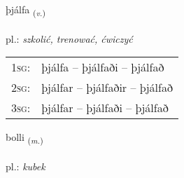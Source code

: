 \documentclass[frontgrid, backgrid]{flacards}\usepackage[]{graphicx}\usepackage[]{xcolor}
\begin{document}
\renewcommand{\flhead}{\vskip5pt \fboxsep=0pt {\small\bfseries\footnotesize Sagnorð | czasownik}}
\renewcommand{\fcfoot}{\vskip5pt \fboxsep=0pt \hspace{2pt}{\small\bfseries\footnotesize 3K}}

\renewcommand{\blhead}{\vskip5pt {\small\bfseries\footnotesize Sagnorð | czasownik }}
\renewcommand{\bcfoot}{\vskip5pt \hspace{2pt}{\small\bfseries\footnotesize 3K}}


{þjálfa \small{\textsubscript{(\textit{v.})}} \\[1ex] %
\textphonetic{[θjaulva]} \\
pl.: \emph{szkolić, trenować, ćwiczyć} \\  [2ex]
\renewcommand*{\arraystretch}{0.8}
\begin{tabular}{p{1cm}l}
\textsc{1sg}: & þjálfa -- þjálfaði -- þjálfað \\ 
\textsc{2sg}: & þjálfar -- þjálfaðir -- þjálfað \\ 
\textsc{3sg}: & þjálfar -- þjálfaði -- þjálfað \\ 
\end{tabular}
}

\renewcommand{\flhead}{\vskip5pt \fboxsep=0pt {\small\bfseries\footnotesize Nafnorð | rzeczownik}}
\renewcommand{\fcfoot}{\vskip5pt \fboxsep=0pt \hspace{2pt}{\small\bfseries\footnotesize 3K}}

\renewcommand{\blhead}{\vskip5pt {\small\bfseries\footnotesize Nafnorð | rzeczownik }}
\renewcommand{\bcfoot}{\vskip5pt \hspace{2pt}{\small\bfseries\footnotesize 3K}}


{bolli \small{\textsubscript{(\textit{m.})}} \\[1ex] %
\textphonetic{[pɔtlɪ]} \\
pl.: \emph{kubek} \\  [2ex]
\renewcommand*{\arraystretch}{0.8}
}
\end{document}
